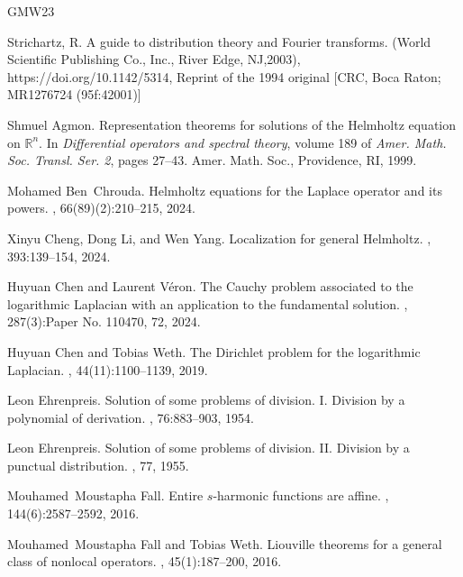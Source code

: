\documentclass[11pt]{amsart}
\begin{document}
\begin{thebibliography}{GMW23}

Strichartz, R. A guide to distribution theory and Fourier transforms. (World Scientific Publishing Co., Inc., River Edge, NJ,2003), https://doi.org/10.1142/5314, Reprint of the 1994 original [CRC, Boca Raton; MR1276724 (95f:42001)]

Shmuel Agmon.
\newblock Representation theorems for solutions of the {H}elmholtz equation on
  {$\mathbb{R}^n$}.
\newblock In {\em Differential operators and spectral theory}, volume 189 of
  {\em Amer. Math. Soc. Transl. Ser. 2}, pages 27--43. Amer. Math. Soc.,
  Providence, RI, 1999.

Mohamed Ben~Chrouda.
\newblock Helmholtz equations for the {L}aplace operator and its powers.
, 66(89)(2):210--215, 2024.

Xinyu Cheng, Dong Li, and Wen Yang.
\newblock Localization for general {H}elmholtz.
, 393:139--154, 2024.

Huyuan Chen and Laurent V\'{e}ron.
\newblock The {C}auchy problem associated to the logarithmic {L}aplacian with
  an application to the fundamental solution.
, 287(3):Paper No. 110470, 72, 2024.

Huyuan Chen and Tobias Weth.
\newblock The {D}irichlet problem for the logarithmic {L}aplacian.
, 44(11):1100--1139, 2019.

Leon Ehrenpreis.
\newblock Solution of some problems of division. {I}. {D}ivision by a
  polynomial of derivation.
, 76:883--903, 1954.

Leon Ehrenpreis.
\newblock Solution of some problems of division. {II}. {D}ivision by a punctual
  distribution.
, 77, 1955.

Mouhamed~Moustapha Fall.
\newblock Entire {$s$}-harmonic functions are affine.
, 144(6):2587--2592, 2016.

Mouhamed~Moustapha Fall and Tobias Weth.
\newblock Liouville theorems for a general class of nonlocal operators.
, 45(1):187--200, 2016.


\end{thebibliography}
\end{document}
